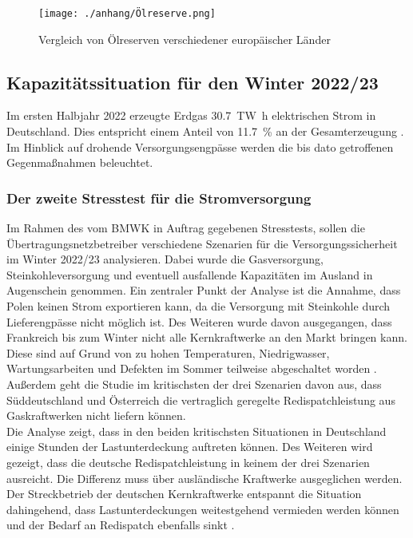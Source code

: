 			\begin{figure}[H]
				\centering
				\texttt{[image: ./anhang/Ölreserve.png]}
				\caption{Vergleich von Ölreserven verschiedener europäischer Länder \cite{IEA_Ölreserven}}
				\label{Abb. Strategische Ölreserve} 
			\end{figure}
		
		
	\subsection{Kapazitätssituation für den Winter 2022/23}
	
		Im ersten Halbjahr 2022 erzeugte Erdgas \SI{30,7}{\tera\watt\hour} elektrischen Strom in Deutschland. 
		Dies entspricht einem Anteil von \SI{11,7}{\percent} an der Gesamterzeugung \cite{Stromproduktion_Erdgas}. 
		Im Hinblick auf drohende Versorgungsengpässe werden die bis dato getroffenen Gegenmaßnahmen beleuchtet. 
	
		\subsubsection{Der zweite Stresstest für die Stromversorgung}
		
			Im Rahmen des vom BMWK in Auftrag gegebenen Stresstests, sollen die Übertragungsnetzbetreiber verschiedene Szenarien für die Versorgungssicherheit im Winter 2022/23 analysieren. 
			Dabei wurde die Gasversorgung, Steinkohleversorgung und eventuell ausfallende Kapazitäten im Ausland in Augenschein genommen.		
			Ein zentraler Punkt der Analyse ist die Annahme, dass Polen keinen Strom exportieren kann, da die Versorgung mit Steinkohle durch Lieferengpässe nicht möglich ist.
			Des Weiteren wurde davon ausgegangen, dass Frankreich bis zum Winter nicht alle Kernkraftwerke an den Markt bringen kann. 
			Diese sind auf Grund von zu hohen Temperaturen, Niedrigwasser, Wartungsarbeiten und Defekten im Sommer teilweise abgeschaltet worden \cite{AKW_Frankreich}. 
			Außerdem geht die Studie im kritischsten der drei Szenarien davon aus, dass Süddeutschland und Österreich die vertraglich geregelte Redispatchleistung aus Gaskraftwerken nicht liefern können. \\
			
			Die Analyse zeigt, dass in den beiden kritischsten Situationen in Deutschland einige Stunden der Lastunterdeckung auftreten können. 
			Des Weiteren wird gezeigt, dass die deutsche Redispatchleistung in keinem der drei Szenarien ausreicht. 
			Die Differenz muss über ausländische Kraftwerke ausgeglichen werden. 
			Der Streckbetrieb der deutschen Kernkraftwerke entspannt die Situation dahingehend, dass Lastunterdeckungen weitestgehend vermieden werden können und der Bedarf an Redispatch ebenfalls sinkt \cite{Stresstest}. \\
			
